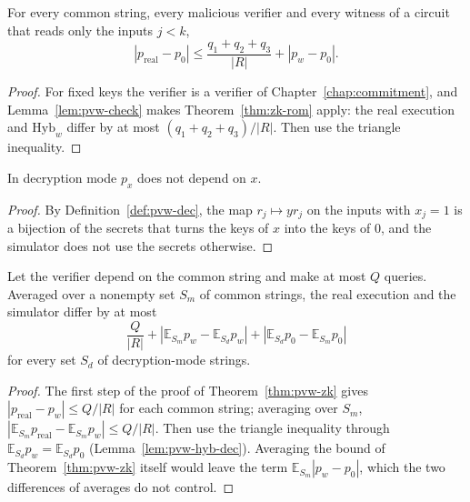 \begin{theorem}
  \label{thm:pvw-zk}
  \leanok
  For every common string, every malicious verifier and every witness of a circuit that reads only
  the inputs $j < k$,
  \[ |p_{\mathrm{real}} - p_0| \leq \frac{q_1 + q_2 + q_3}{|R|} + |p_w - p_0| . \]
\end{theorem}

\begin{proof}
  \leanok
  For fixed keys the verifier is a verifier of Chapter~\ref{chap:commitment}, and
  Lemma~\ref{lem:pvw-check} makes Theorem~\ref{thm:zk-rom} apply: the real execution and
  $\mathrm{Hyb}_w$ differ by at most $(q_1 + q_2 + q_3)/|R|$. Then use the triangle inequality.
\end{proof}

\begin{lemma}
  \label{lem:pvw-hyb-dec}
  \leanok
  In decryption mode $p_x$ does not depend on $x$.
\end{lemma}

\begin{proof}
  \leanok
  By Definition~\ref{def:pvw-dec}, the map $r_j \mapsto y r_j$ on the inputs with $x_j = 1$ is a
  bijection of the secrets that turns the keys of $x$ into the keys of $0$, and the simulator does
  not use the secrets otherwise.
\end{proof}

\begin{theorem}
  \label{thm:pvw-zk-modes}
  \leanok
  Let the verifier depend on the common string and make at most $Q$ queries. Averaged over a
  nonempty set $S_m$ of common strings, the real execution and the simulator differ by at most
  \[ \frac{Q}{|R|} + |\mathbb{E}_{S_m} p_w - \mathbb{E}_{S_d} p_w| +
     |\mathbb{E}_{S_d} p_0 - \mathbb{E}_{S_m} p_0| \]
  for every set $S_d$ of decryption-mode strings.
\end{theorem}

\begin{proof}
  \leanok
  The first step of the proof of Theorem~\ref{thm:pvw-zk} gives
  $|p_{\mathrm{real}} - p_w| \leq Q/|R|$ for each common string; averaging over $S_m$,
  $|\mathbb{E}_{S_m} p_{\mathrm{real}} - \mathbb{E}_{S_m} p_w| \leq Q/|R|$. Then use the triangle
  inequality through $\mathbb{E}_{S_d} p_w = \mathbb{E}_{S_d} p_0$ (Lemma~\ref{lem:pvw-hyb-dec}).
  Averaging the bound of Theorem~\ref{thm:pvw-zk} itself would leave the term
  $\mathbb{E}_{S_m} |p_w - p_0|$, which the two differences of averages do not control.
\end{proof}

